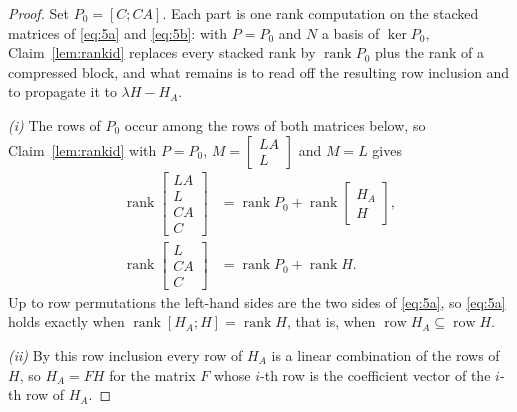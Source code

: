 \documentclass[journal]{IEEEtran}
\theoremstyle{plainn}
\theoremstyle{remark}
\begin{document}
\begin{proof}
Set $P_0=[C;CA]$. Each part is one rank computation on the stacked matrices of \eqref{eq:5a} and
\eqref{eq:5b}: with $P=P_0$ and $N$ a basis of $\ker P_0$, Claim~\ref{lem:rankid} replaces every
stacked rank by $\operatorname{rank}P_0$ plus the rank of a compressed block, and what remains is to
read off the resulting row inclusion and to propagate it to $\lambda H-H_A$.

\emph{(i)} The rows of $P_0$ occur among the rows of both matrices below, so Claim~\ref{lem:rankid} with $P=P_0$, $M=\begin{bmatrix}LA\\L\end{bmatrix}$ and $M=L$ gives
\begin{equation*}
\begin{aligned}
\operatorname{rank}\begin{bmatrix}LA\\ L\\ CA\\ C\end{bmatrix}
&=\operatorname{rank}P_0+\operatorname{rank}\begin{bmatrix}H_A\\ H\end{bmatrix},\\
\operatorname{rank}\begin{bmatrix}L\\ CA\\ C\end{bmatrix}
&=\operatorname{rank}P_0+\operatorname{rank}H .
\end{aligned}
\end{equation*}
Up to row permutations the left-hand sides are the two sides of \eqref{eq:5a}, so \eqref{eq:5a}
holds exactly when $\operatorname{rank}[H_A;H]=\operatorname{rank}H$, that is, when
$\operatorname{row}H_A\subseteq\operatorname{row}H$.

\emph{(ii)} By this row inclusion every row of $H_A$ is a linear combination of the rows of $H$, so
$H_A=FH$ for the matrix $F$ whose $i$-th row is the coefficient vector of the $i$-th row of $H_A$.


\end{proof}
\end{document}
